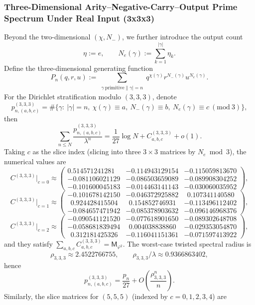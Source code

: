 \subsubsection{Three-Dimensional Arity--Negative-Carry--Output Prime Spectrum Under Real Input (3x3x3)}\label{app:real-input-40-arity-prime-spectrum-3d}
Beyond the two-dimensional $(\chi,N_-)$, we further introduce the output count
\[
\eta:=e,\qquad N_e(\gamma):=\sum_{k=1}^{|\gamma|}\eta_k.
\]
Define the three-dimensional generating function
\[
P_n(q,r,u):=\sum_{\substack{\gamma\ \mathrm{primitive}\|\gamma|=n}} q^{\chi(\gamma)}r^{N_-(\gamma)}u^{N_e(\gamma)}.
\]
For the Dirichlet stratification modulo $(3,3,3)$, denote
\[
p_{n,(a,b,c)}^{(3,3,3)}
=\#\{\gamma:\ |\gamma|=n,\ \chi(\gamma)\equiv a,\ N_-(\gamma)\equiv b,\ N_e(\gamma)\equiv c\ (\mathrm{mod}\ 3)\},
\]
then
\[
\sum_{n\le N}\frac{p_{n,(a,b,c)}^{(3,3,3)}}{\lambda^n}
=\frac{1}{27}\log N+C_{a,b,c}^{(3,3,3)}+o(1).
\]
Taking $c$ as the slice index (slicing into three $3\times 3$ matrices by $N_e\bmod 3$), the numerical values are
\[
C^{(3,3,3)}\big|_{c=0}\approx
\begin{pmatrix}
0.514571241281 & -0.114943129154 & -0.115059813670\\
-0.081106021129 & -0.086503659089 & -0.089908304252\\
-0.101600045183 & -0.014463141143 & -0.030060035952
\end{pmatrix},
\]
\[
C^{(3,3,3)}\big|_{c=1}\approx
\begin{pmatrix}
-0.101678142150 & -0.046372925882 & \ \ 0.107341140580\\
\ \ 0.924428415504 & \ \ 0.154852746931 & -0.113496112402\\
-0.084657471942 & -0.085378903632 & -0.096146968376
\end{pmatrix},
\]
\[
C^{(3,3,3)}\big|_{c=2}\approx
\begin{pmatrix}
-0.090541121520 & -0.077618901650 & -0.089302648708\\
-0.058681839494 & \ \ 0.004038838860 & -0.029353054870\\
\ \ 0.312181425326 & -0.116041151361 & -0.071597413922
\end{pmatrix},
\]
and they satisfy $\sum_{a,b,c}C_{a,b,c}^{(3,3,3)}=\mathsf{M}_{\varphi^2}$.
The worst-case twisted spectral radius is
\[
\rho_{3,3,3}\approx 2.4522766755,\qquad \rho_{3,3,3}/\lambda\approx 0.9366863402,
\]
hence
\[
p_{n,(a,b,c)}^{(3,3,3)}=\frac{p_n}{27}+O\!\left(\frac{\rho_{3,3,3}^n}{n}\right).
\]
Similarly, the slice matrices for $(5,5,5)$ (indexed by $c=0,1,2,3,4$) are
